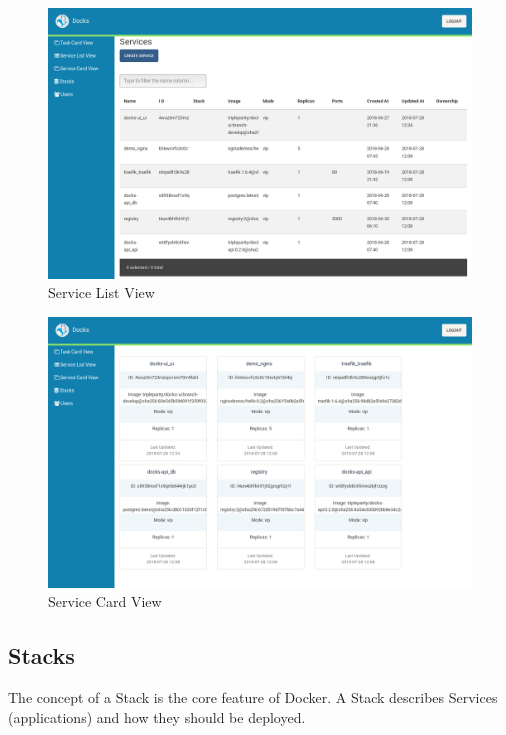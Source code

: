 \documentclass[]{article}
\begin{document}
\begin{figure}[H]
	\centering
	\includegraphics[scale=0.4]{service_list_view.png}
	\caption{Service List View}
\end{figure}

\begin{figure}[H]
	\centering
	\includegraphics[scale=0.4]{service_card_view.png}
	\caption{Service Card View}
\end{figure}

\subsection{Stacks}
The concept of a Stack is the core feature of Docker.
A Stack describes Services (applications) and how they should be deployed.
\end{document}
